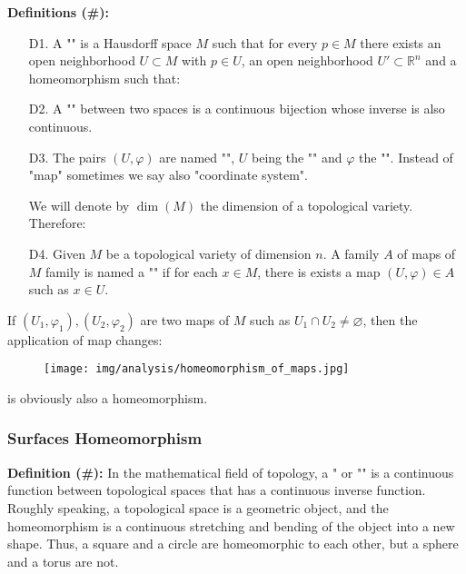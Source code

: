 	\textbf{Definitions (\#\mydef):}
	\begin{enumerate}
		\item[D1.] A "" is a Hausdorff space $M$ such that for every $p\in M$ there exists an open neighborhood $U\subset M$ with $p\in U$, an open neighborhood $U' \subset \mathbb{R}^n$ and a homeomorphism such that:

		\item[D2.] A "" between two spaces is a continuous bijection whose inverse is also continuous.

		\item[D3.] The pairs $(U,\varphi)$ are named "", $U$ being the "" and $\varphi$ the "". Instead of "map" sometimes we say also "coordinate system".

		\begin{tcolorbox}[title=Remark,colframe=black,arc=10pt]
		We will denote by $\dim(M)$ the dimension of a topological variety. Therefore:
		
		\end{tcolorbox}
	
		\item[D4.] Given $M$ be a topological variety of dimension $n$. A family $A$ of maps of $M$ family is named a  "" if for each $x\in M$, there is exists a map $(U, \varphi)\in A$ such as $x\in U$.
	\end{enumerate}
	If $(U_1,\varphi_1),(U_2,\varphi_2)$ are two maps of $M$ such as $U_1\cap U_2\neq \varnothing$, then the application of map changes:
	
	\begin{figure}[H]
		\centering
		\texttt{[image: img/analysis/homeomorphism\_of\_maps.jpg]}
	\end{figure}
	is obviously also a homeomorphism.

	\subsubsection{Surfaces Homeomorphism}
	\textbf{Definition (\#\mydef):} In the mathematical field of topology, a " or "" is a continuous function between topological spaces that has a continuous inverse function. Roughly speaking, a topological space is a geometric object, and the homeomorphism is a continuous stretching and bending of the object into a new shape. Thus, a square and a circle are homeomorphic to each other, but a sphere and a torus are not. 
	
